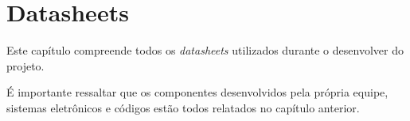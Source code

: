

\chapter{Datasheets}
\label{chap:anexosA}

    Este capítulo compreende todos os \textit{datasheets} utilizados durante o desenvolver do projeto.

    É importante ressaltar que os componentes desenvolvidos pela própria equipe, sistemas eletrônicos e códigos estão todos relatados no capítulo anterior.

    
    

    
     
     